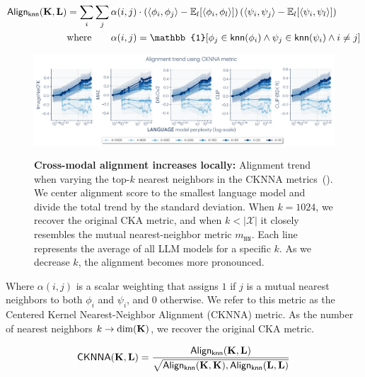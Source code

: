 \begin{align}
\mathsf{Align_{knn}}(\bK, \bL) &= \sum_i \sum_j \alpha(i, j) \cdot \left(\langle \phi_i, \phi_j \rangle - \mathbb{E}_l[\langle \phi_i, \phi_l \rangle]\right) \left(\langle \psi_i, \psi_j \rangle - \mathbb{E}_l[\langle \psi_i, \psi_l\rangle]\right) \\
&\text{where} \qquad \alpha(i, j) = \mathbb{1}[\phi_j \in \mathsf{knn}(\phi_i) \land \psi_j \in \mathsf{knn}(\psi_i) \land i \neq j]
\end{align}

\begin{figure}[t!]
    \centering
    \includegraphics[width=0.98\linewidth]{figures/cknna.pdf}\\
    \caption{\small \textbf{Cross-modal alignment increases locally:} 
    Alignment trend when varying the top-$k$ nearest neighbors in the CKNNA metrics~(). We center alignment score to the smallest language model and divide the total trend by the standard deviation. When $k=1024$, we recover the original CKA metric, and when $k < | \mathcal{X} |$ it closely resembles the mutual nearest-neighbor metric $m_{\texttt{NN}}$. Each line represents the average of all LLM models for a specific $k$. As we decrease $k$, the alignment becomes more pronounced.}
    \label{fig:cknna}
    \vspace{-3pt}
\end{figure}

Where $\alpha(i, j)$ is a scalar weighting that assigns $1$ if $j$ is a mutual nearest neighbors to both $\phi_i$ and $\psi_i$, and $0$ otherwise. We refer to this metric as the Centered Kernel Nearest-Neighbor Alignment (CKNNA) metric. As the number of nearest neighbors $k \rightarrow \dim(\mathbf{K})$, we recover the original CKA metric. 

\begin{align}
\label{eqn:cknna}
\mathsf{CKNNA}(\mathbf{K}, \mathbf{L}) = \frac{\mathsf{Align_{knn}}(\mathbf{K}, \mathbf{L})}{\sqrt{\mathsf{Align_{knn}}(\mathbf{K}, \mathbf{K}), \mathsf{Align_{knn}}(\mathbf{L}, \mathbf{L})}}
\end{align}


